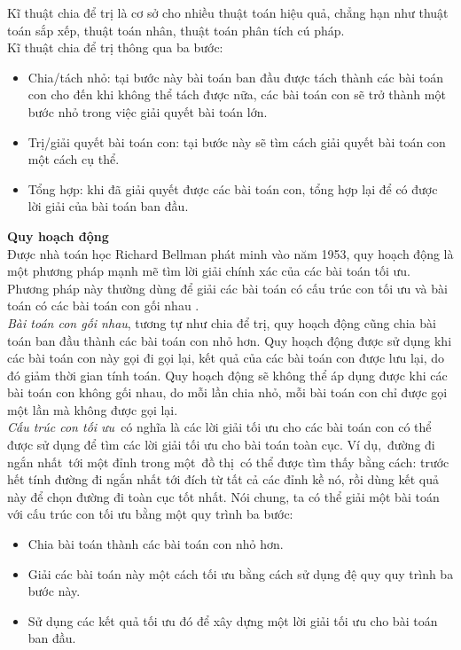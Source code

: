 Kĩ thuật chia để trị là cơ sở cho nhiều thuật toán hiệu quả, chẳng hạn như thuật toán sắp xếp, thuật toán nhân, thuật toán phân tích cú pháp. 
\\Kĩ thuật chia để trị thông qua ba bước:
\begin{itemize}
    \item Chia/tách nhỏ: tại bước này bài toán ban đầu được tách thành các bài toán con cho đến khi không thể tách được nữa, các bài toán con sẽ trở thành một bước nhỏ trong việc giải quyết bài toán lớn.
    \item Trị/giải quyết bài toán con: tại bước này sẽ tìm cách giải quyết bài toán con một cách cụ thể.
    \item Tổng hợp: khi đã giải quyết được các bài toán con, tổng hợp lại để có được lời giải của bài toán ban đầu.
\end{itemize}
\textbf{Quy hoạch động}
\\Được nhà toán học Richard Bellman phát minh vào năm 1953, quy hoạch động là một phương pháp mạnh mẽ tìm lời giải chính xác của các bài toán tối ưu. Phương pháp này thường dùng để giải các bài toán có cấu trúc con tối ưu và bài toán có các bài toán con gối nhau \cite{gtvlt}.
\\ \emph{Bài toán con gối nhau}, tương tự như chia để trị, quy hoạch động cũng chia bài toán ban đầu thành các bài toán con nhỏ hơn. Quy hoạch động được sử dụng khi các bài toán con này gọi đi gọi lại, kết quả của các bài toán con được lưu lại, do đó giảm thời gian tính toán.
Quy hoạch động sẽ không thể áp dụng được khi các bài toán con không gối nhau, do mỗi lần chia nhỏ, mỗi bài toán con chỉ được gọi một lần mà không được gọi lại.
\\ \emph{Cấu trúc con tối ưu} có nghĩa là các lời giải tối ưu cho các bài toán con có thể được sử dụng để tìm các lời giải tối ưu cho bài toán toàn cục. Ví dụ, đường đi ngắn nhất tới một đỉnh trong một đồ thị có thể được tìm thấy bằng cách: trước hết tính đường đi ngắn nhất tới đích từ tất cả các đỉnh kề nó, rồi dùng kết quả này để chọn đường đi toàn cục tốt nhất. Nói chung, ta có thể giải một bài toán với cấu trúc con tối ưu bằng một quy trình ba bước:
\begin{itemize}
    \item Chia bài toán thành các bài toán con nhỏ hơn.
    \item Giải các bài toán này một cách tối ưu bằng cách sử dụng đệ quy quy trình ba bước này.
    \item Sử dụng các kết quả tối ưu đó để xây dựng một lời giải tối ưu cho bài toán ban đầu.
\end{itemize}
